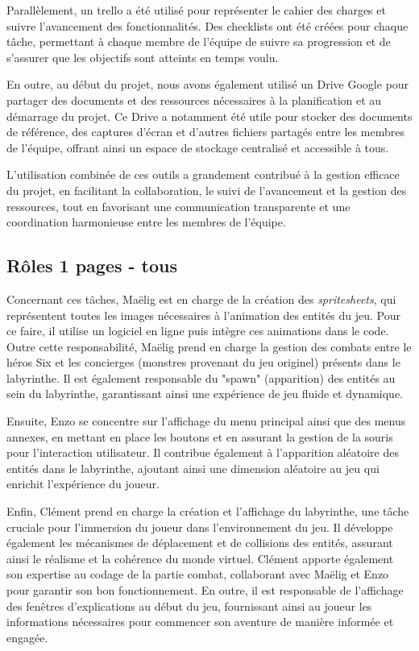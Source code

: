 \documentclass[10pt]{article}
\begin{document}
Parallèlement, un \gls{trello} a été utilisé pour représenter le cahier des charges et suivre l'avancement des fonctionnalités. Des checklists ont été créées pour chaque tâche, permettant à chaque membre de l'équipe de suivre sa progression et de s'assurer que les objectifs sont atteints en temps voulu.

En outre, au début du projet, nous avons également utilisé un Drive Google pour partager des documents et des ressources nécessaires à la planification et au démarrage du projet. Ce Drive a notamment été utile pour stocker des documents de référence, des captures d'écran et d'autres fichiers partagés entre les membres de l'équipe, offrant ainsi un espace de stockage centralisé et accessible à tous.

L'utilisation combinée de ces outils a grandement contribué à la gestion efficace du projet, en facilitant la collaboration, le suivi de l'avancement et la gestion des ressources, tout en favorisant une communication transparente et une coordination harmonieuse entre les membres de l'équipe.


\subsection{Rôles 1 pages - tous}
Concernant ces tâches, Maëlig est en charge de la création des \textit{\gls{spritesheets}}, qui représentent toutes les images nécessaires à l'animation des entités du jeu. Pour ce faire, il utilise un logiciel en ligne puis intègre ces animations dans le code. Outre cette responsabilité, Maëlig prend en charge la gestion des combats entre le héros Six et les concierges (monstres provenant du jeu originel) présents dans le labyrinthe. Il est également responsable du "spawn" (apparition) des entités au sein du labyrinthe, garantissant ainsi une expérience de jeu fluide et dynamique.

Ensuite, Enzo se concentre sur l'affichage du menu principal ainsi que des menus annexes, en mettant en place les boutons et en assurant la gestion de la souris pour l'interaction utilisateur. Il contribue également à l'apparition aléatoire des entités dans le labyrinthe, ajoutant ainsi une dimension aléatoire au jeu qui enrichit l'expérience du joueur.

Enfin, Clément prend en charge la création et l'affichage du labyrinthe, une tâche cruciale pour l'immersion du joueur dans l'environnement du jeu. Il développe également les mécanismes de déplacement et de collisions des entités, assurant ainsi le réalisme et la cohérence du monde virtuel. Clément apporte également son expertise au codage de la partie combat, collaborant avec Maëlig et Enzo pour garantir son bon fonctionnement. En outre, il est responsable de l'affichage des fenêtres d'explications au début du jeu, fournissant ainsi au joueur les informations nécessaires pour commencer son aventure de manière informée et engagée.
\end{document}
